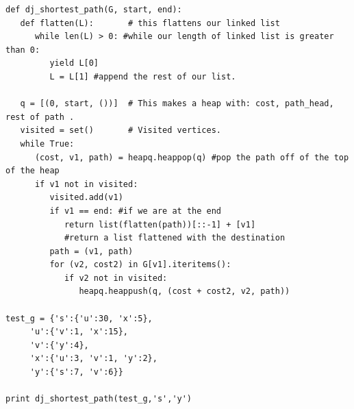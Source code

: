 \documentclass[11pt]{article} %
\begin{document}
{{{\begin{verbatim}
def dj_shortest_path(G, start, end):
   def flatten(L):       # this flattens our linked list 
      while len(L) > 0: #while our length of linked list is greater than 0: 
         yield L[0]
         L = L[1] #append the rest of our list.

   q = [(0, start, ())]  # This makes a heap with: cost, path_head, rest of path .
   visited = set()       # Visited vertices.
   while True:
      (cost, v1, path) = heapq.heappop(q) #pop the path off of the top of the heap 
      if v1 not in visited:
         visited.add(v1)
         if v1 == end: #if we are at the end 
            return list(flatten(path))[::-1] + [v1] 
            #return a list flattened with the destination 
         path = (v1, path)
         for (v2, cost2) in G[v1].iteritems():
            if v2 not in visited:
               heapq.heappush(q, (cost + cost2, v2, path))

test_g = {'s':{'u':30, 'x':5},
     'u':{'v':1, 'x':15},
     'v':{'y':4},
     'x':{'u':3, 'v':1, 'y':2},
     'y':{'s':7, 'v':6}}

print dj_shortest_path(test_g,'s','y')


\end{verbatim}}}}
\end{document}
